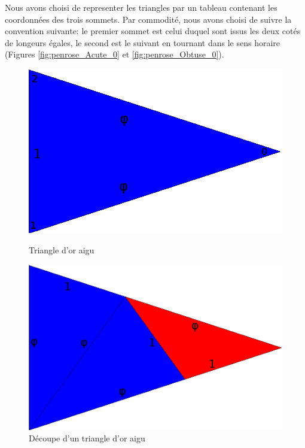 \documentclass[a4paper, 11pt]{article}%
\begin{document}
                Nous avons choisi de representer les triangles par un
                tableau contenant les coordonnées des trois
                sommets. Par commodité, nous avons choisi de suivre la
                convention suivante: le premier sommet est celui duquel sont issus les deux
                cotés de longeurs égales, le second est le suivant en
                tournant dans le sens horaire (Figures
                \ref{fig:penrose_Acute_0} et \ref{fig:penrose_Obtuse_0}).

		\begin{figure}
			  \includegraphics[width=\linewidth]{penrose_Acute_0.png}
			  \caption{Triangle d'or aigu}\label{fig:penrose_Acute_O}
			\endminipage\hfill
			  \includegraphics[width=\linewidth]{penrose_Acute_1.png}
			  \caption{Découpe d'un triangle d'or aigu}\label{fig:penrose_Acute_1}
			\endminipage\hfill

\end{figure}
\end{document}
